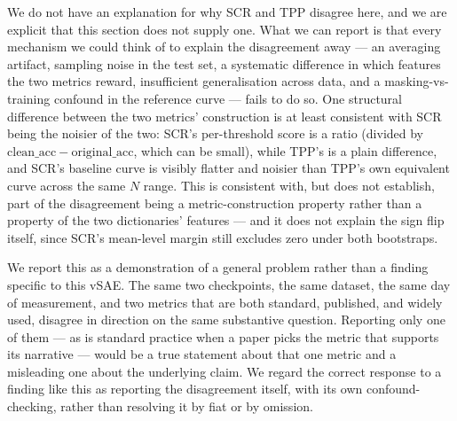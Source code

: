 \documentclass[11pt]{article}
\begin{document}
We do not have an explanation for why SCR and TPP disagree here, and we are
explicit that this section does not supply one. What we can report is that
every mechanism we could think of to explain the disagreement away ---
an averaging artifact, sampling noise in the test set, a systematic
difference in which features the two metrics reward, insufficient
generalisation across data, and a masking-vs-training confound in the
reference curve --- fails to do so. One structural difference between the
two metrics' construction is at least consistent with SCR being the noisier
of the two: SCR's per-threshold score is a ratio (divided by
$\mathrm{clean\_acc}-\mathrm{original\_acc}$, which can be small), while
TPP's is a plain difference, and SCR's baseline curve is visibly flatter and
noisier than TPP's own equivalent curve across the same $N$ range. This is
consistent with, but does not establish, part of the disagreement being a
metric-construction property rather than a property of the two dictionaries'
features --- and it does not explain the sign flip itself, since SCR's
mean-level margin still excludes zero under both bootstraps.

We report this as a demonstration of a general problem rather than a
finding specific to this vSAE. The same two checkpoints, the same dataset,
the same day of measurement, and two metrics that are both standard,
published, and widely used, disagree in direction on the same substantive
question. Reporting only one of them --- as is standard practice when a
paper picks the metric that supports its narrative --- would be a true
statement about that one metric and a misleading one about the underlying
claim. We regard the correct response to a finding like this as reporting
the disagreement itself, with its own confound-checking, rather than
resolving it by fiat or by omission.
\end{document}
